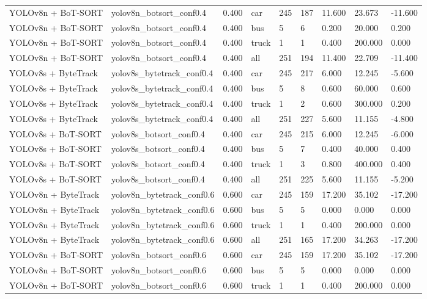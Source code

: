 \begin{tabular}{lllllllll}
YOLOv8n + BoT-SORT & yolov8n\_botsort\_conf0.4 & 0.400 & car & 245 & 187 & 11.600 & 23.673 & -11.600 \\
YOLOv8n + BoT-SORT & yolov8n\_botsort\_conf0.4 & 0.400 & bus & 5 & 6 & 0.200 & 20.000 & 0.200 \\
YOLOv8n + BoT-SORT & yolov8n\_botsort\_conf0.4 & 0.400 & truck & 1 & 1 & 0.400 & 200.000 & 0.000 \\
YOLOv8n + BoT-SORT & yolov8n\_botsort\_conf0.4 & 0.400 & all & 251 & 194 & 11.400 & 22.709 & -11.400 \\
YOLOv8s + ByteTrack & yolov8s\_bytetrack\_conf0.4 & 0.400 & car & 245 & 217 & 6.000 & 12.245 & -5.600 \\
YOLOv8s + ByteTrack & yolov8s\_bytetrack\_conf0.4 & 0.400 & bus & 5 & 8 & 0.600 & 60.000 & 0.600 \\
YOLOv8s + ByteTrack & yolov8s\_bytetrack\_conf0.4 & 0.400 & truck & 1 & 2 & 0.600 & 300.000 & 0.200 \\
YOLOv8s + ByteTrack & yolov8s\_bytetrack\_conf0.4 & 0.400 & all & 251 & 227 & 5.600 & 11.155 & -4.800 \\
YOLOv8s + BoT-SORT & yolov8s\_botsort\_conf0.4 & 0.400 & car & 245 & 215 & 6.000 & 12.245 & -6.000 \\
YOLOv8s + BoT-SORT & yolov8s\_botsort\_conf0.4 & 0.400 & bus & 5 & 7 & 0.400 & 40.000 & 0.400 \\
YOLOv8s + BoT-SORT & yolov8s\_botsort\_conf0.4 & 0.400 & truck & 1 & 3 & 0.800 & 400.000 & 0.400 \\
YOLOv8s + BoT-SORT & yolov8s\_botsort\_conf0.4 & 0.400 & all & 251 & 225 & 5.600 & 11.155 & -5.200 \\
YOLOv8n + ByteTrack & yolov8n\_bytetrack\_conf0.6 & 0.600 & car & 245 & 159 & 17.200 & 35.102 & -17.200 \\
YOLOv8n + ByteTrack & yolov8n\_bytetrack\_conf0.6 & 0.600 & bus & 5 & 5 & 0.000 & 0.000 & 0.000 \\
YOLOv8n + ByteTrack & yolov8n\_bytetrack\_conf0.6 & 0.600 & truck & 1 & 1 & 0.400 & 200.000 & 0.000 \\
YOLOv8n + ByteTrack & yolov8n\_bytetrack\_conf0.6 & 0.600 & all & 251 & 165 & 17.200 & 34.263 & -17.200 \\
YOLOv8n + BoT-SORT & yolov8n\_botsort\_conf0.6 & 0.600 & car & 245 & 159 & 17.200 & 35.102 & -17.200 \\
YOLOv8n + BoT-SORT & yolov8n\_botsort\_conf0.6 & 0.600 & bus & 5 & 5 & 0.000 & 0.000 & 0.000 \\
YOLOv8n + BoT-SORT & yolov8n\_botsort\_conf0.6 & 0.600 & truck & 1 & 1 & 0.400 & 200.000 & 0.000 \\

\end{tabular}
